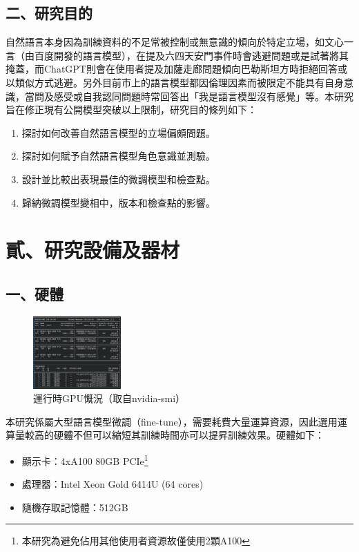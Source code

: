 \documentclass[12pt,a4paper,MingLiU,UTF8,natbib]{article}
\begin{document}
	\subsection{二、研究目的}
	自然語言本身因為訓練資料的不足常被控制或無意識的傾向於特定立場，如文心一言（由百度開發的語言模型），在提及六四天安門事件時會逃避問題或是試著將其掩蓋，而ChatGPT則會在使用者提及加薩走廊問題傾向巴勒斯坦方時拒絕回答或以類似方式逃避。另外目前市上的語言模型都因倫理因素而被限定不能具有自身意識，當問及感受或自我認同問題時常回答出「我是語言模型沒有感覺」等。本研究旨在修正現有公開模型突破以上限制，研究目的條列如下：
	\begin{enumerate}
		\item 探討如何改善自然語言模型的立場偏頗問題。
		\item 探討如何賦予自然語言模型角色意識並測驗。
		\item 設計並比較出表現最佳的微調模型和檢查點。
		\item 歸納微調模型變相中，版本和檢查點的影響。
	\end{enumerate}
	\section{貳、研究設備及器材}
	\subsection{一、硬體}
		\begin{figure}
		\centering
		\includegraphics[width=0.3\textwidth]{nividiasmi}
		\caption{運行時GPU慨況（取自nvidia-smi）}
	\end{figure}
	
	本研究係屬大型語言模型微調（fine-tune），需要耗費大量運算資源，因此選用運算量較高的硬體不但可以縮短其訓練時間亦可以提昇訓練效果。硬體如下：
	

	\begin{itemize}
		\item 顯示卡：4xA100 80GB PCIe\footnote{本研究為避免佔用其他使用者資源故僅使用2顆A100}
		\item 處理器：Intel Xeon Gold 6414U (64 cores)
		\item 隨機存取記憶體：512GB
	\end{itemize}
\end{document}
